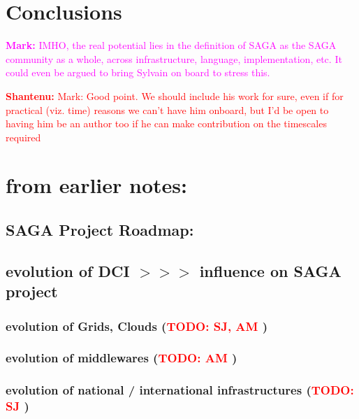\documentclass{article}
\newcommand{\B}[1]{\textbf{#1}}
\newcommand{\todo}[1]{{\textcolor{red}{\B{TODO:} #1 }}}
\newcommand{\jhanote}[1]{{\textcolor{red}{     \B{Shantenu:} #1 }}}
\newcommand{\msnote}[1]{{\textcolor{magenta}{ \B{Mark:    } #1 }}}
\newcommand{\jhanote}[1]{}
\newcommand{\msnote}[1]{}
\begin{document}
\section{Conclusions}

\msnote{IMHO, the real potential lies in the definition of SAGA as the
  SAGA community as a whole, across infrastructure, language,
  implementation, etc.  It could even be argued to bring Sylvain on
  board to stress this.}

\jhanote{Mark: Good point. We should include his work for sure, even
  if for practical (viz. time) reasons we can't have him onboard, but
  I'd be open to having him be an author too if he can make
  contribution on the timescales required}


\label{sec:sum}






\newpage

\section{\B{from earlier notes:}}


 \subsection{ SAGA Project Roadmap:}


 \subsection{ evolution of DCI $>>>$ influence on SAGA project}
 \subsubsection{ evolution of Grids, Clouds (\todo{SJ, AM})}
 \subsubsection{ evolution of middlewares (\todo{AM})}
 \subsubsection{ evolution of national / international infrastructures (\todo{SJ})}
\end{document}
